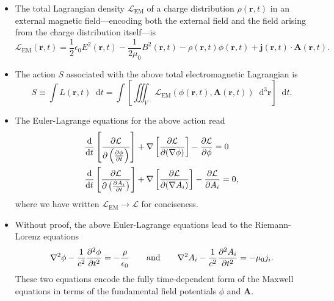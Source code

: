\documentclass[11pt, a4paper]{article}
\newcommand{\diff}{\mathop{}\!\mathrm{d}} %
\newcommand{\dr}{\diff^{3} \r}  %
\newcommand{\eqtext}[1]{\qquad \text{#1} \qquad}
\renewcommand{\L}{\mathcal{L}}  %
\renewcommand{\vec}[1]{\bm{#1}} %
\renewcommand{\r}{\vec{r}}
\newcommand{\A}{\vec{A}} %
\newcommand{\ee}{\epsilon_{0}}  %
\newcommand{\mm}{\mu_{0}}  %
\renewcommand{\j}{\vec{j}}  %
\renewcommand{\grad}{\nabla}
\renewcommand{\laplacian}{\nabla^{2}}
\begin{document}
\begin{itemize}

    \item The total Lagrangian density $ \L_{\text{EM}} $ of a charge distribution $ \rho(\r, t) $ in an external magnetic field---encoding both the external field and the field arising from the charge distribution itself---is
	\begin{equation*}
		\L_{\text{EM}}(\r, t) = \frac{1}{2}\ee E^{2}(\r, t) - \frac{1}{2\mm}B^{2}(\r, t) - \rho(\r, t)\phi(\r, t) + \j(\r, t) \cdot \A(\r, t).
	\end{equation*}

	\item The action $ S $ associated with the above total electromagnetic Lagrangian is 
	\begin{equation*}
        S \equiv \int L(\r, t) \diff t = \int \left[ \iiint_{V} \L_{\text{EM}}(\phi(\r, t), \A(\r, t))\dr \right] \diff t.
	\end{equation*}
	
    \item The Euler-Lagrange equations for the above action read
	\begin{align*}
		&\dv{t}\left[\pdv{\L}{\left(\pdv{\phi}{t}\right)}\right] + \grad \left[\pdv{\L}{(\grad \phi)}\right] - \pdv{\L}{\phi} = 0\\
		& \dv{t} \left[\pdv{\L}{\left(\pdv{A_{i}}{t}\right)}\right] + \grad \left[\pdv{\L}{(\grad A_{i})}\right] - \pdv{\L}{A_{i}} = 0,
	\end{align*}
    where we have written $ \L_{\text{EM}} \to \L $ for conciseness. 
	
	\item Without proof, the above Euler-Lagrange equations lead to the Riemann-Lorenz equations
	\begin{align*}
		\laplacian \phi - \frac{1}{c^{2}}\pdv[2]{\phi}{t} = -\frac{\rho}{\ee} \eqtext{and} \laplacian A_{i} - \frac{1}{c^{2}} \pdv[2]{A_{i}}{t} = - \mm j_{i}.
	\end{align*}
	These two equations encode the fully time-dependent form of the Maxwell equations in terms of the fundamental field potentials $ \phi $ and $ \A $.
	

\end{itemize}
\end{document}
